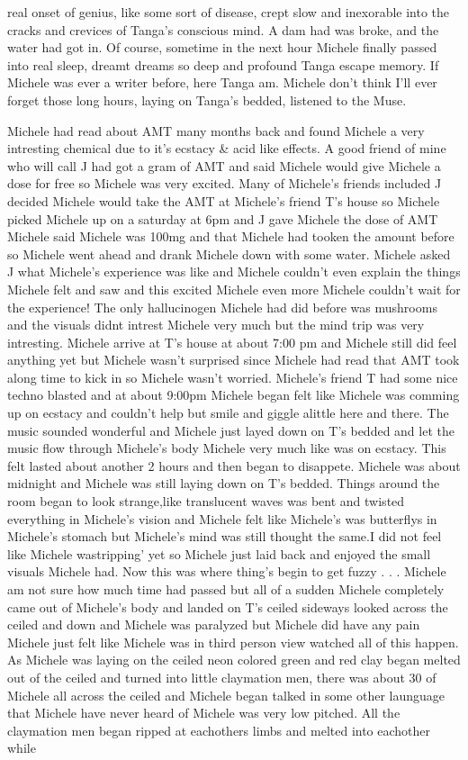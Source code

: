 \documentclass[12pt]{book}
\begin{document}
real onset of genius, like some sort of disease, crept slow and inexorable into the cracks and crevices of Tanga's conscious mind. A dam had was broke, and the water had got in. Of course, sometime in the next hour Michele finally passed into real sleep, dreamt dreams so deep and profound Tanga escape memory. If Michele was ever a writer before, here Tanga am. Michele don't think I'll ever forget those long hours, laying on Tanga's bedded, listened to the Muse.



Michele had read about AMT many months back and found Michele a very intresting chemical due to it's ecstacy \& acid like effects. A good friend of mine who will call J had got a gram of AMT and said Michele would give Michele a dose for free so Michele was very excited. Many of Michele's friends included J decided Michele would take the AMT at Michele's friend T's house so Michele picked Michele up on a saturday at 6pm and J gave Michele the dose of AMT Michele said Michele was 100mg and that Michele had tooken the amount before so Michele went ahead and drank Michele down with some water. Michele asked J what Michele's experience was like and Michele couldn't even explain the things Michele felt and saw and this excited Michele even more Michele couldn't wait for the experience! The only hallucinogen Michele had did before was mushrooms and the visuals didnt intrest Michele very much but the mind trip was very intresting. Michele arrive at T's house at about 7:00 pm and Michele still did feel anything yet but Michele wasn't surprised since Michele had read that AMT took along time to kick in so Michele wasn't worried. Michele's friend T had some nice techno blasted and at about 9:00pm Michele began felt like Michele was comming up on ecstacy and couldn't help but smile and giggle alittle here and there. The music sounded wonderful and Michele just layed down on T's bedded and let the music flow through Michele's body Michele very much like was on ecstacy. This felt lasted about another 2 hours and then began to disappete. Michele was about midnight and Michele was still laying down on T's bedded. Things around the room began to look strange,like translucent waves was bent and twisted everything in Michele's vision and Michele felt like Michele's was butterflys in Michele's stomach but Michele's mind was still thought the same.I did not feel like Michele wastripping' yet so Michele just laid back and enjoyed the small visuals Michele had. Now this was where thing's begin to get fuzzy . . .  Michele am not sure how much time had passed but all of a sudden Michele completely came out of Michele's body and landed on T's ceiled sideways looked across the ceiled and down and Michele was paralyzed but Michele did have any pain Michele just felt like Michele was in third person view watched all of this happen. As Michele was laying on the ceiled neon colored green and red clay began melted out of the ceiled and turned into little claymation men, there was about 30 of Michele all across the ceiled and Michele began talked in some other launguage that Michele have never heard of Michele was very low pitched. All the claymation men began ripped at eachothers limbs and melted into eachother while 
\end{document}
